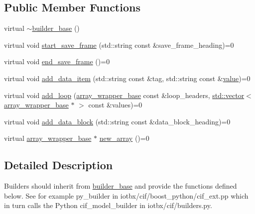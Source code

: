 \subsection*{Public Member Functions}
\begin{DoxyCompactItemize}
\item 
virtual \hyperlink{structucif_1_1builder__base_ae38efec39bd091fbe5117f732c5f408a}{$\sim$builder\-\_\-base} ()
\item 
virtual void \hyperlink{structucif_1_1builder__base_adf4a4dd00c9a1ef1cae5e934c3aaf465}{start\-\_\-save\-\_\-frame} (std\-::string const \&save\-\_\-frame\-\_\-heading)=0
\item 
virtual void \hyperlink{structucif_1_1builder__base_a5acd4bff5c981a82d207028553912147}{end\-\_\-save\-\_\-frame} ()=0
\item 
virtual void \hyperlink{structucif_1_1builder__base_a082a3d1605be4fc68f6d65a04ce15a15}{add\-\_\-data\-\_\-item} (std\-::string const \&tag, std\-::string const \&\hyperlink{read_config_file_8m_afcc7a4b78ecd8fa7e713f8cfa0f51017}{value})=0
\item 
virtual void \hyperlink{structucif_1_1builder__base_aeb7ebb2ba494d97fe5806e0ef77f5b39}{add\-\_\-loop} (\hyperlink{structucif_1_1array__wrapper__base}{array\-\_\-wrapper\-\_\-base} const \&loop\-\_\-headers, \hyperlink{qmb_8m_af54b69a32590de218622e869b06b47b3}{std\-::vector}$<$ \hyperlink{structucif_1_1array__wrapper__base}{array\-\_\-wrapper\-\_\-base} $\ast$ $>$ const \&values)=0
\item 
virtual void \hyperlink{structucif_1_1builder__base_aebd321770945eaea5acdc8a57ba19dbd}{add\-\_\-data\-\_\-block} (std\-::string const \&data\-\_\-block\-\_\-heading)=0
\item 
virtual \hyperlink{structucif_1_1array__wrapper__base}{array\-\_\-wrapper\-\_\-base} $\ast$ \hyperlink{structucif_1_1builder__base_a70da885cbe1f8089dc73a8175a1c3620}{new\-\_\-array} ()=0
\end{DoxyCompactItemize}


\subsection{Detailed Description}
Builders should inherit from \hyperlink{structucif_1_1builder__base}{builder\-\_\-base} and provide the functions defined below. See for example py\-\_\-builder in iotbx/cif/boost\-\_\-python/cif\-\_\-ext.\-pp which in turn calls the Python cif\-\_\-model\-\_\-builder in iotbx/cif/builders.\-py. 

